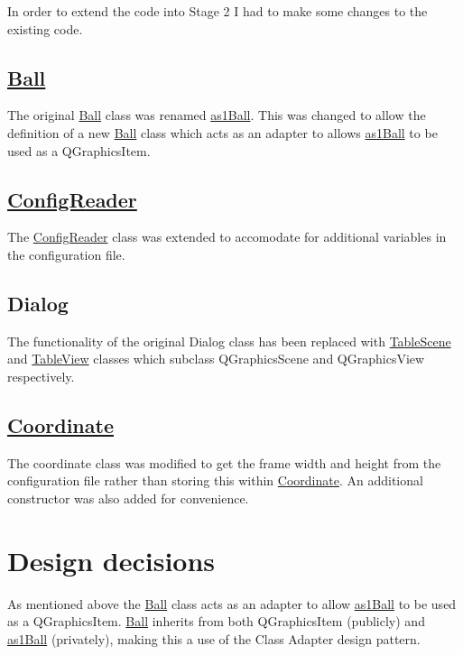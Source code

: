 In order to extend the code into Stage 2 I had to make some changes to the existing code.

\subsection*{\hyperlink{class_ball}{Ball} }

The original \hyperlink{class_ball}{Ball} class was renamed \hyperlink{classas1_ball}{as1\+Ball}. This was changed to allow the definition of a new \hyperlink{class_ball}{Ball} class which acts as an adapter to allows \hyperlink{classas1_ball}{as1\+Ball} to be used as a Q\+Graphics\+Item.

\subsection*{\hyperlink{class_config_reader}{Config\+Reader} }

The \hyperlink{class_config_reader}{Config\+Reader} class was extended to accomodate for additional variables in the configuration file.

\subsection*{Dialog }

The functionality of the original Dialog class has been replaced with \hyperlink{class_table_scene}{Table\+Scene} and \hyperlink{class_table_view}{Table\+View} classes which subclass Q\+Graphics\+Scene and Q\+Graphics\+View respectively.

\subsection*{\hyperlink{class_coordinate}{Coordinate} }

The coordinate class was modified to get the frame width and height from the configuration file rather than storing this within \hyperlink{class_coordinate}{Coordinate}. An additional constructor was also added for convenience.

\section*{Design decisions }

As mentioned above the \hyperlink{class_ball}{Ball} class acts as an adapter to allow \hyperlink{classas1_ball}{as1\+Ball} to be used as a Q\+Graphics\+Item. \hyperlink{class_ball}{Ball} inherits from both Q\+Graphics\+Item (publicly) and \hyperlink{classas1_ball}{as1\+Ball} (privately), making this a use of the Class Adapter design pattern.

